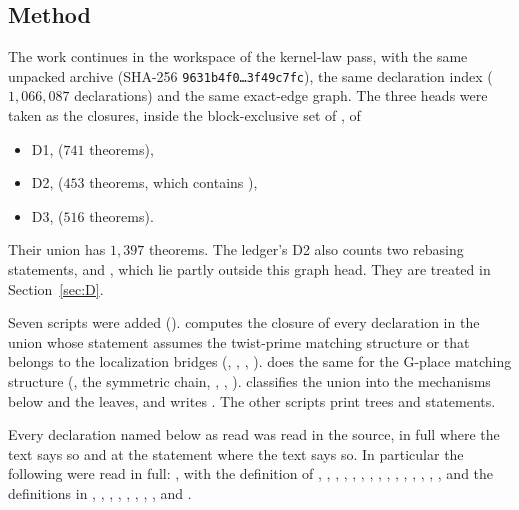 \documentclass[11pt]{article}
\theoremstyle{definition}
\theoremstyle{remark}
\begin{document}
\subsection{Method}
The work continues in the workspace of the kernel-law pass, with the same unpacked archive (SHA-256 \texttt{9631b4f0\ldots 3f49c7fc}), the same declaration index ($1{,}066{,}087$ declarations) and the same exact-edge graph. The three heads were taken as the closures, inside the block-exclusive set of , of
\begin{itemize}[leftmargin=*,itemsep=1pt]
\item D1,  ($741$ theorems),
\item D2,  ($453$ theorems, which contains ),
\item D3,  ($516$ theorems).
\end{itemize}
Their union has $1{,}397$ theorems. The ledger's D2 also counts two rebasing statements,  and , which lie partly outside this graph head. They are treated in Section~\ref{sec:D}.

Seven scripts were added ().  computes the closure of every declaration in the union whose statement assumes the twist-prime matching structure  or that belongs to the localization bridges (, , , ).  does the same for the G-place matching structure (, the symmetric chain, , , ).  classifies the union into the mechanisms below and the leaves, and writes . The other scripts print trees and statements.

Every declaration named below as read was read in the source, in full where the text says so and at the statement where the text says so. In particular the following were read in full: ,  with the definition of , , , , , , , , , , , , , , , and the definitions in , , , , , , , ,  and .
\end{document}

